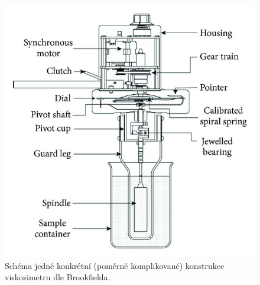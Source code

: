 \documentclass[12pt]{article}
\begin{document}
\begin{figure}[h!]
    \centering
    \includegraphics[width = 0.6\linewidth]{figures/brookfield.png}
    \caption{Schéma jedné konkrétní (poměrně komplikované) konstrukce viskozimetru dle Brookfielda.~\cite{Figure:Brookfield}}
    \label{fig:brookfield}
\end{figure}
\end{document}
